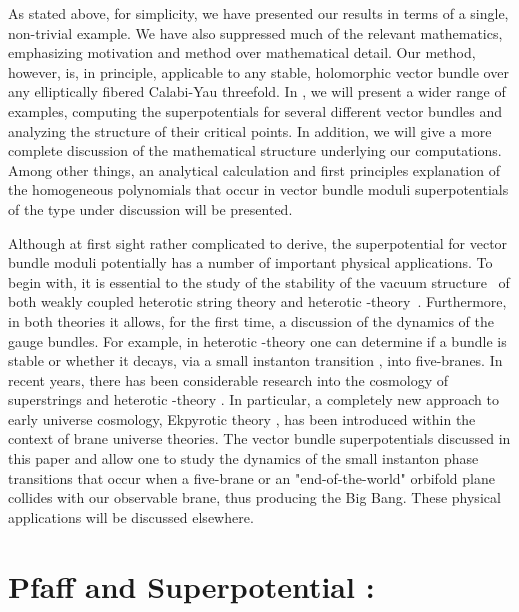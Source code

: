 \documentclass[a4paper,12pt]{article}
\numberwithin{equation}{section}
\theoremstyle{plain}
\begin{document}
As stated above, for simplicity, we have presented our results in terms of
a
single, non-trivial example. We have also suppressed much of the relevant
mathematics, emphasizing motivation and method over mathematical detail.
Our method, however, is, in principle,
applicable to any stable, holomorphic vector bundle
over
any elliptically fibered Calabi-Yau threefold.
In \cite{BDOnew}, we will present a wider
range of examples, computing the superpotentials for several different
vector
bundles and analyzing the structure of their critical points. In addition,
we
will
give a more complete discussion of the mathematical structure underlying
our
computations. Among other things, an analytical calculation
and first principles explanation of the homogeneous polynomials that occur
in vector bundle moduli superpotentials of the
type under discussion will be presented.

Although at first sight rather complicated to derive,
the superpotential for vector
bundle
moduli potentially has a number of important physical applications. To
begin
with, it is essential to the study of the stability of the vacuum
structure~\cite{CK,MPS} of
both weakly coupled heterotic string theory and
heterotic \coordHE{}-theory~\cite{hmt1,hmt2,hmt3}.
Furthermore, in both theories it allows, for the first time, a discussion
of
the dynamics of the gauge bundles. For example, in heterotic \coordHE{}-theory
one
can determine if a bundle is stable or whether it decays, via a small
instanton transition \cite{Pantev}, into five-branes.
In recent years, there has been
considerable research into the cosmology of superstrings and heterotic
\coordHE{}-theory \cite{low4, hos, blo} .
In particular, a completely new approach to early universe
cosmology, Ekpyrotic theory \cite{ekp1,ekp2,ekp3,ekp4,ekp5},
has been introduced within the context of
brane universe theories. The vector bundle superpotentials discussed in
this
paper and \cite{BDOnew} allow one to study the dynamics of the small
instanton phase
transitions that occur when a five-brane \cite{ekp1,ekp2} or
an "end-of-the-world" orbifold
plane \cite{ekp3,ekp4,ekp5} collides with our observable brane,
thus producing the Big Bang. These physical applications will be discussed
elsewhere.




\section{Pfaff\coordHE{} and Superpotential \coordHE{}:}
\end{document}
